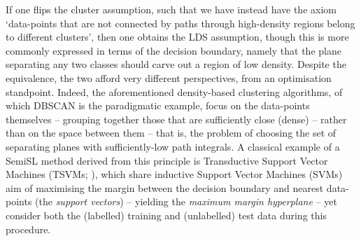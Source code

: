 %
If one flips the cluster assumption, such that we have instead have the axiom `data-points that are
not connected by paths through high-density regions belong to different clusters', then one obtains
the LDS assumption, though this is more commonly expressed in terms of the decision boundary,
namely that the plane separating any two classes should carve out a region of low density.
%
Despite the equivalence, the two afford very different perspectives, from an optimisation
standpoint. Indeed, the aforementioned density-based clustering algorithms, of which DBSCAN
\citep{ester1996density} is the paradigmatic example, focus on the data-points themselves --
grouping together those that are sufficiently close (dense) -- rather than on the space between
them -- that is, the problem of choosing the set of separating planes with sufficiently-low path
integrals.
%
A classical example of a SemiSL method derived from this principle is Transductive Support Vector
Machines (TSVMs; \cite{joachims1999transductive}), which share inductive Support Vector Machines
(SVMs) aim of maximising the margin between the decision boundary and nearest data-points (the
\emph{support vectors}) -- yielding the \emph{maximum margin hyperplane} -- yet consider both the
(labelled) training and (unlabelled) test data during this procedure.
%

